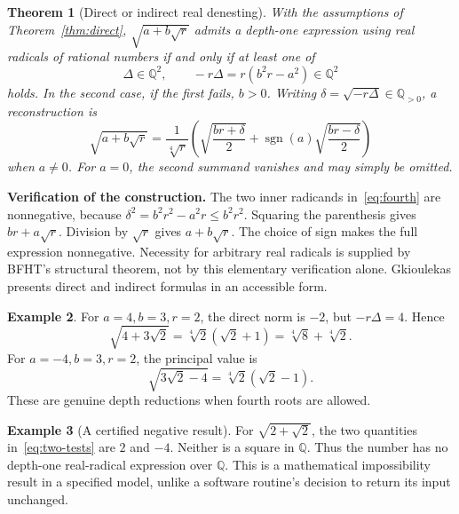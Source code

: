 \documentclass[11pt,a4paper]{article}
\newcommand{\Q}{\mathbb{Q}}
\newcommand{\sgn}{\operatorname{sgn}}
\newtheorem{theorem}{Theorem}[section]
\theoremstyle{definition}
\newtheorem{example}[theorem]{Example}
\theoremstyle{remark}
\numberwithin{equation}{section}
\begin{document}
\begin{theorem}[Direct or indirect real denesting]\label{thm:fourth}
With the assumptions of Theorem~\ref{thm:direct}, $\sqrt{a+b\sqrt r}$ admits a depth-one expression using real radicals of rational numbers if and only if at least one of
\begin{equation}\label{eq:two-tests}
 \Delta\in\Q^2,
 \qquad -r\Delta=r(b^2r-a^2)\in\Q^2
\end{equation}
holds. In the second case, if the first fails, $b>0$. Writing $\delta=\sqrt{-r\Delta}\in\Q_{>0}$, a reconstruction is
\begin{equation}\label{eq:fourth}
 \sqrt{a+b\sqrt r}
 =\frac{1}{\sqrt[4]{r}}
 \left(\sqrt{\frac{br+\delta}{2}}
       +\sgn(a)\sqrt{\frac{br-\delta}{2}}\right)
\end{equation}
when $a\ne0$. For $a=0$, the second summand vanishes and may simply be omitted.
\end{theorem}

\textbf{Verification of the construction.}
The two inner radicands in~\eqref{eq:fourth} are nonnegative, because $\delta^2=b^2r^2-a^2r\le b^2r^2$. Squaring the parenthesis gives $br+a\sqrt r$. Division by $\sqrt r$ gives $a+b\sqrt r$. The choice of sign makes the full expression nonnegative. Necessity for arbitrary real radicals is supplied by BFHT's structural theorem, not by this elementary verification alone. Gkioulekas presents direct and indirect formulas in an accessible form.\cite{bfht,gkioulekas}

\begin{example}
For $a=4,b=3,r=2$, the direct norm is $-2$, but $-r\Delta=4$. Hence
\begin{equation}
 \sqrt{4+3\sqrt2}=\sqrt[4]{2}(\sqrt2+1)
                    =\sqrt[4]{8}+\sqrt[4]{2}.
\end{equation}
For $a=-4,b=3,r=2$, the principal value is
\[
 \sqrt{3\sqrt2-4}=\sqrt[4]{2}(\sqrt2-1).
\]
These are genuine depth reductions when fourth roots are allowed.
\end{example}

\begin{example}[A certified negative result]
For $\sqrt{2+\sqrt2}$, the two quantities in~\eqref{eq:two-tests} are $2$ and $-4$. Neither is a square in $\Q$. Thus the number has no depth-one real-radical expression over $\Q$. This is a mathematical impossibility result in a specified model, unlike a software routine's decision to return its input unchanged.
\end{example}
\end{document}
